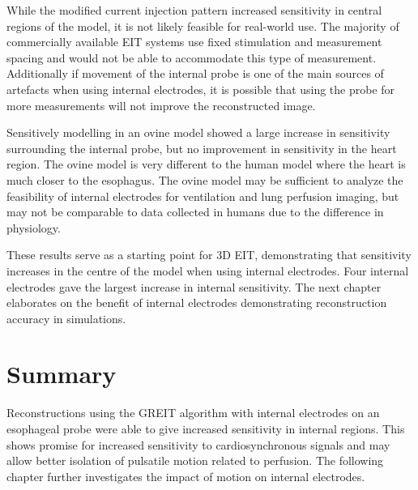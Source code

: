 While the modified current injection pattern increased sensitivity in central
regions of the model, it is not likely feasible for real-world use. 
The majority of commercially available EIT systems use fixed  stimulation and measurement spacing
and would not be able to accommodate this type of measurement. 
Additionally if movement of the internal probe is one of the main sources of artefacts when 
using internal electrodes, it is possible that using the probe for 
more measurements will not improve the reconstructed image.

Sensitively modelling in an ovine model showed a large 
increase in sensitivity surrounding the
internal probe, but no improvement in sensitivity in the heart region.
The ovine model is very different to the human model where 
the heart is much closer to the esophagus. The ovine model may be sufficient 
to analyze the feasibility of internal electrodes for ventilation and lung perfusion imaging, 
but may not be comparable to data collected in humans due to the difference in 
physiology. 

These results serve as a starting point for 3D EIT, demonstrating 
that sensitivity increases  
in the centre of the model when using internal electrodes. 
Four internal electrodes gave the largest increase in internal sensitivity.
The next chapter elaborates on the benefit of internal electrodes
demonstrating reconstruction accuracy in simulations. 

\section{Summary}
Reconstructions using the GREIT algorithm
with internal electrodes on 
an esophageal probe were able to give increased
sensitivity in internal regions. This shows promise for increased 
sensitivity to cardiosynchronous signals 
and may allow better isolation of pulsatile 
motion related to perfusion. 
The following chapter further investigates the impact of motion on internal 
electrodes.